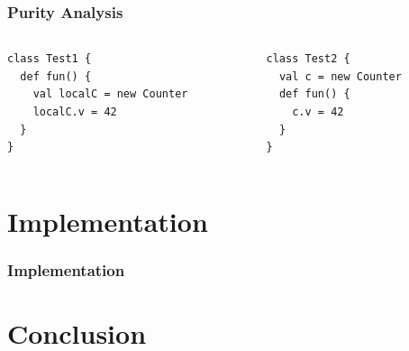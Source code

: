 \documentclass[hyperref={pdfpagelabels=false}]{beamer}
\begin{document}
\begin{frame}[fragile]
    \frametitle{Purity Analysis}
    \begin{columns}
      \begin{column}{0.4\textwidth}
\begin{lstlisting}
class Test1 {
  def fun() {
    val localC = new Counter
    localC.v = 42
  }
}
\end{lstlisting}
      \end{column}
      \begin{column}{0.6\textwidth}
\begin{lstlisting}
class Test2 {
  val c = new Counter
  def fun() {
    c.v = 42
  }
}
\end{lstlisting}
      \end{column}
    \end{columns}
\end{frame}

\section{Implementation}
\begin{frame}
    \frametitle{Implementation}
    
\end{frame}

\section{Conclusion}
\end{document}
